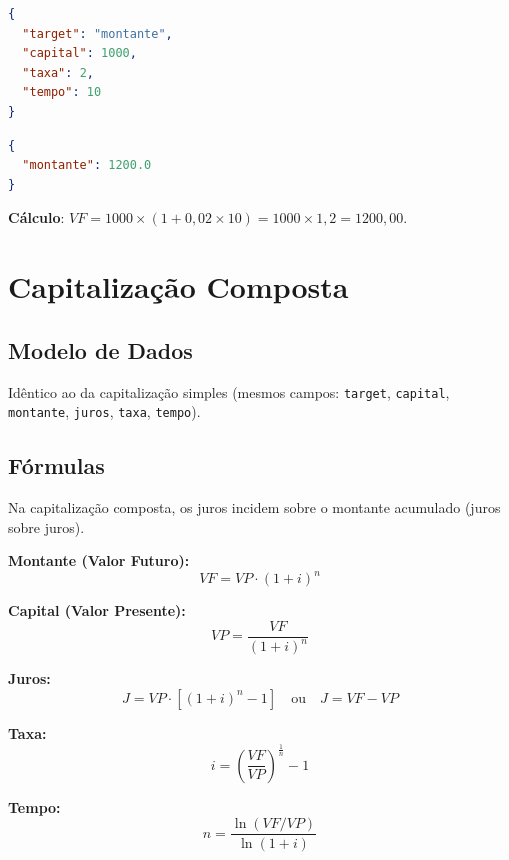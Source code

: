 \documentclass[12pt,a4paper]{article}
\begin{document}
\begin{lstlisting}[language=json,title={POST /api/simples/calculate}]
{
  "target": "montante",
  "capital": 1000,
  "taxa": 2,
  "tempo": 10
}
\end{lstlisting}

\begin{lstlisting}[language=json,title={Resposta}]
{
  "montante": 1200.0
}
\end{lstlisting}

\textbf{Cálculo}: $VF = 1000 \times (1 + 0{,}02 \times 10) = 1000 \times 1{,}2 = 1200{,}00$.

\section{Capitalização Composta}
\label{sec:composta}

\subsection{Modelo de Dados}

Idêntico ao da capitalização simples (mesmos campos: \texttt{target}, \texttt{capital}, \texttt{montante}, \texttt{juros}, \texttt{taxa}, \texttt{tempo}).

\subsection{Fórmulas}

Na capitalização composta, os juros incidem sobre o montante acumulado (juros sobre juros).

\begin{tcolorbox}[colback=white,colframe=teal600,title=Fórmulas --- Juros Compostos]

\textbf{Montante (Valor Futuro):}
\begin{equation}
  VF = VP \cdot (1 + i)^n
\end{equation}

\textbf{Capital (Valor Presente):}
\begin{equation}
  VP = \frac{VF}{(1 + i)^n}
\end{equation}

\textbf{Juros:}
\begin{equation}
  J = VP \cdot \left[(1 + i)^n - 1\right] \quad \text{ou} \quad J = VF - VP
\end{equation}

\textbf{Taxa:}
\begin{equation}
  i = \left(\frac{VF}{VP}\right)^{\!\frac{1}{n}} - 1
\end{equation}

\textbf{Tempo:}
\begin{equation}
  n = \frac{\ln(VF / VP)}{\ln(1 + i)}
\end{equation}

\end{tcolorbox}
\end{document}
